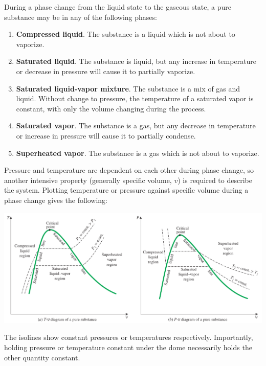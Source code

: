 During a phase change from the liquid state to the gaseous state, a pure substance may be in any of the following phases:
\begin{enumerate}
    \item \textbf{Compressed liquid}. The substance is a liquid which is not about to vaporize.
    \item \textbf{Saturated liquid}. The substance is liquid, but any increase in temperature or decrease in pressure will cause it to partially vaporize.
    \item \textbf{Saturated liquid-vapor mixture}. The substance is a mix of gas and liquid. Without change to pressure, the temperature of a saturated vapor is constant, with only the volume changing during the process.
    \item \textbf{Saturated vapor}. The substance is a gas, but any decrease in temperature or increase in pressure will cause it to partially condense.
    \item \textbf{Superheated vapor}. The substance is a gas which is not about to vaporize.
\end{enumerate}

Pressure and temperature are dependent on each other during phase change, so another intensive property (generally specific volume, $v$) is required to describe the system. Plotting temperature or pressure against specific volume during a phase change gives the following:

\begin{center}
\includegraphics[width=\textwidth]{Images/thermo1.png}
\end{center}

The isolines show constant pressures or temperatures respectively. Importantly, holding pressure or temperature constant under the dome necessarily holds the other quantity constant.


